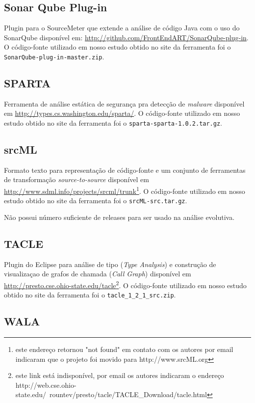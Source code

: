 \subsection{Sonar Qube Plug-in}

Plugin para o SourceMeter que extende a análise de
código Java com o uso do SonarQube disponível em:
\url{http://github.com/FrontEndART/SonarQube-plug-in}. O código-fonte
utilizado em nosso estudo obtido no site da ferramenta foi o
\texttt{SonarQube-plug-in-master.zip}.

\subsection{SPARTA}

Ferramenta de análise estática de segurança pra detecção de {\it
malware} disponível em
\url{http://types.cs.washington.edu/sparta/}. O código-fonte utilizado em nosso
estudo obtido no site da ferramenta foi o \texttt{sparta-sparta-1.0.2.tar.gz}.

\subsection{srcML}

Formato texto para representação de código-fonte e um conjunto de
ferramentas de transformação {\it source-to-source} disponível em
\url{http://www.sdml.info/projects/srcml/trunk}\footnote{este endereço
retornou "not found" em contato com os autores por email indicaram que o
projeto foi movido para http://www.srcML.org}. O código-fonte utilizado em
nosso estudo obtido no site da ferramenta foi o \texttt{srcML-src.tar.gz}.

Não possui número suficiente de releases para ser usado na análise evolutiva.

\subsection{TACLE}

Plugin do Eclipse para análise de tipo ({\it Type Analysis}) e
construção de visualizaçao de grafos de chamada ({\it Call Graph}) disponível em
\url{http://presto.cse.ohio-state.edu/tacle}\footnote{este link está
indisponível, por email os autores indicaram o endereço
http://web.cse.ohio-state.edu/~rountev/presto/tacle/TACLE\_Download/tacle.html}.
O código-fonte utilizado em nosso estudo obtido no site da ferramenta foi o
\texttt{tacle\_1\_2\_1\_src.zip}.

\subsection{WALA}

